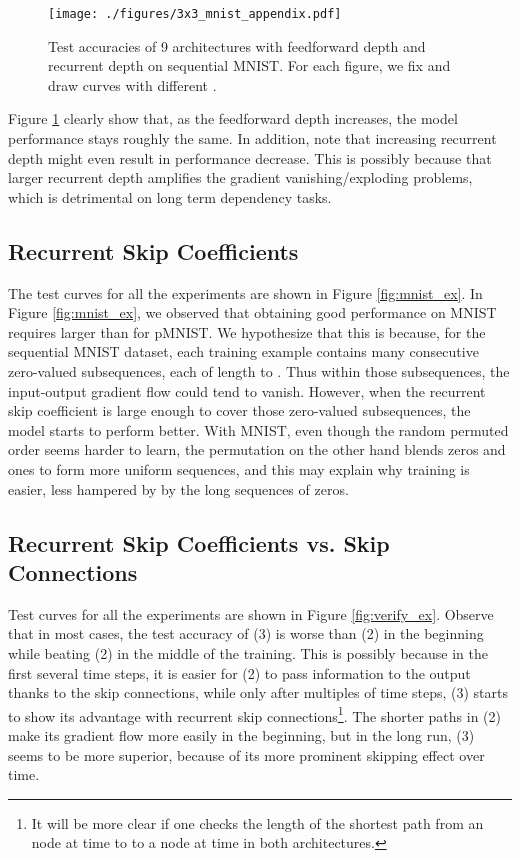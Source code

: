 \begin{figure}[h]
\center
\texttt{[image: ./figures/3x3\_mnist\_appendix.pdf]}
\vspace{-10pt}
\caption{Test accuracies of 9 architectures with feedforward depth 
and recurrent depth  on sequential MNIST. For each figure,
we fix  and draw  curves with different .
}
\label{fig:3xxmnist_ex}
\end{figure}



Figure \ref{fig:3xxmnist_ex}
clearly show that, 
as the feedforward depth
increases, the model performance stays roughly the same.
In addition, note that increasing recurrent depth might even result in performance decrease. 
This is possibly because that larger recurrent depth amplifies the gradient
vanishing/exploding problems, which is detrimental on long term
dependency tasks.


\newpage
\subsection{Recurrent Skip Coefficients}

The test curves for all the experiments are shown in Figure \ref{fig:mnist_ex}. 
In Figure \ref{fig:mnist_ex}, we observed that
obtaining good performance on MNIST requires larger  than for pMNIST.
We hypothesize that this is because, for the sequential MNIST dataset, 
each training example contains many consecutive zero-valued subsequences, each of
length  to . Thus within those subsequences, the input-output gradient flow
could tend to vanish. However, when the recurrent skip coefficient is large enough to cover those
zero-valued subsequences, the model starts to perform better.
With MNIST, even though the random permuted order seems harder to learn, the permutation on the other hand
blends zeros and ones to form more uniform sequences, and this may explain why training is easier, less hampered
by by the long sequences of zeros.

\subsection{Recurrent Skip Coefficients vs. Skip Connections}
Test curves for all the experiments are shown in Figure \ref{fig:verify_ex}.
Observe that in most cases,
the test accuracy of (3) is worse than (2) in the beginning
while beating (2) in the middle of the training.
This is possibly because in the first several time steps, it is easier
for (2) to pass information to the output thanks to the skip connections,
while only after multiples of  time steps, (3) starts to show its
advantage with recurrent skip connections\footnote{It will be more clear if one checks the length
of the shortest path from an node at time  to to a node at time  in both architectures.}.
The shorter paths in (2) make its gradient flow more easily in the beginning,
but in the long run, (3) seems to be more superior, because of its more prominent skipping effect over time. 

